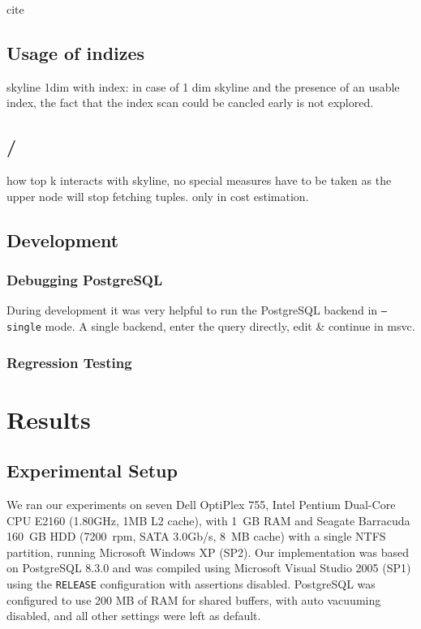 cite \citep{Buchta1989}

\section{Usage of indizes}
skyline 1dim with index: in case of 1 dim skyline and the presence of
an usable index, the fact that the index scan could be cancled early
is not explored.

\section{ / }
how top k interacts with skyline, no special measures have to be taken
as the upper node will stop fetching tuples. only in cost estimation.


\section{Development}
\subsection{Debugging PostgreSQL}
During development it was very helpful to run the PostgreSQL backend
in \texttt{--single} mode. A single backend, enter the query directly,
edit \& continue in msvc.


\subsection{Regression Testing}

\chapter{Results}
\label{chap:Results}


\section{Experimental Setup}
We ran our experiments on seven Dell OptiPlex 755, Intel Pentium
Dual-Core CPU E2160 (1.80GHz, 1MB L2 cache), with 1~GB RAM and Seagate
Barracuda 160~GB HDD (7200~rpm, SATA 3.0Gb/s, 8~MB cache) with a
single NTFS partition,
running Microsoft Windows XP (SP2).
% 
Our implementation was based on PostgreSQL 8.3.0 and was compiled
using Microsoft Visual Studio 2005 (SP1) using the \texttt{RELEASE}
configuration with assertions disabled.
%
PostgreSQL was configured to use 200 MB of RAM for shared buffers,
with auto vacuuming disabled, and all other settings were left as
default.

